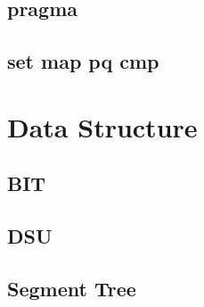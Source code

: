 \documentclass[a4paper,10pt,twocolumn,oneside,x11names]{article}
\begin{document}
\subsection{pragma}


\subsection{set map pq cmp}


%

%

\section{Data Structure}

\subsection{BIT}


\subsection{DSU}


\subsection{Segment Tree}


%
\end{document}

